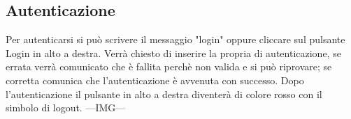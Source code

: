 \subsection{Autenticazione}
Per autenticarsi si può scrivere il messaggio "login" oppure cliccare sul pulsante Login in alto a destra. Verrà chiesto di inserire la propria  di autenticazione, se errata verrà comunicato che è fallita perchè non valida e si può riprovare; se corretta comunica che l'autenticazione è avvenuta con successo. 
Dopo l'autenticazione il pulsante in alto a destra diventerà di colore rosso con il simbolo di logout. ---IMG--- \newline

\newpage